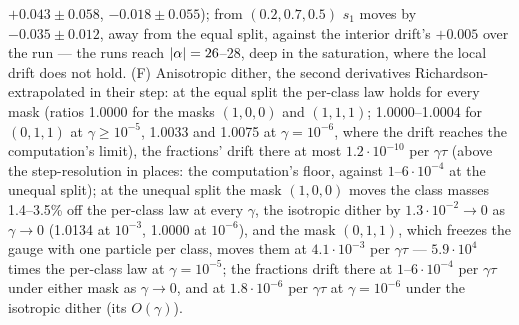 \begin{sloppypar}
$+0.043\pm0.058$, $-0.018\pm0.055$); from $(0.2, 0.7, 0.5)$ $s_1$ moves by $-0.035\pm0.012$, away from the equal split,
against the interior drift's $+0.005$ over the run --- the runs reach $\lvert \alpha\rvert = 26$--28, deep in the saturation,
where the local drift does not hold. (F) Anisotropic dither, the second derivatives Richardson-extrapolated in their
step: at the equal split the per-class law holds for every mask (ratios 1.0000 for the masks $(1, 0, 0)$ and
$(1, 1, 1)$; 1.0000--1.0004 for $(0, 1, 1)$ at $\gamma\ge10^{-5}$, 1.0033 and 1.0075 at $\gamma = 10^{-6}$, where the
drift reaches the computation's limit), the fractions' drift there at most $1.2\cdot10^{-10}$ per $\gamma\tau$ (above
the step-resolution in places: the computation's floor, against $1$--$6\cdot10^{-4}$ at the unequal split); at the
unequal split the mask $(1, 0, 0)$ moves the class masses 1.4--3.5\% off the per-class law at every $\gamma$, the
isotropic dither by $1.3\cdot10^{-2}\to0$ as $\gamma\to0$ (1.0134 at $10^{-3}$, 1.0000 at $10^{-6}$), and the mask
$(0, 1, 1)$, which freezes the gauge with one particle per class, moves them at $4.1\cdot10^{-3}$ per $\gamma\tau$ ---
$5.9\cdot10^4$ times the per-class law at $\gamma = 10^{-5}$; the fractions drift there at $1$--$6\cdot10^{-4}$ per
$\gamma\tau$ under either mask as $\gamma\to0$, and at $1.8\cdot10^{-6}$ per $\gamma\tau$ at $\gamma = 10^{-6}$ under
the isotropic dither (its $O(\gamma)$).
\end{sloppypar}

